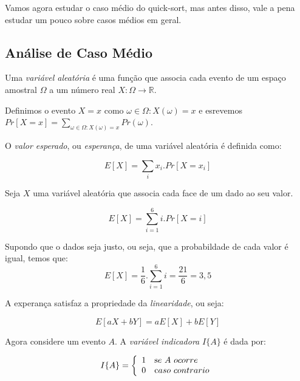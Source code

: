 Vamos agora estudar o caso médio do quick-sort, mas antes disso, vale a pena estudar um pouco sobre casos médios em geral.

\subsection{Análise de Caso Médio}

Uma {\em variável aleatória} é uma função que associa cada evento de um espaço amostral $\Omega$ a um número real $X: \Omega \to \mathbb{R}$.

Definimos o evento $X = x$ como ${\omega \in \Omega : X(\omega) = x}$ e esrevemos $Pr[X=x] = \sum_{\omega \in \Omega : X(\omega) = x}Pr(\omega)$.

O {\em valor esperado}, ou {\em esperança}, de uma variável aleatória é definida como:

\begin{displaymath}
  E[X] = \sum_i x_i.Pr[X = x_i]
\end{displaymath}

\begin{example}
  Seja $X$ uma variável aleatória que associa cada face de um dado ao seu valor.

  \begin{displaymath}
    E[X] = \sum_{i=1}^6 i.Pr[X = i]
  \end{displaymath}

  Supondo que o dados seja justo, ou seja, que a probabildade de cada valor é igual, temos que:
\begin{displaymath}
    E[X] = \frac{1}{6}.\sum_{i=1}^6 i = \frac{21}{6} = 3,5
  \end{displaymath}
  
\end{example}

A experança satisfaz a propriedade da {\em linearidade}, ou seja:

\begin{displaymath}
  E[aX + bY] = aE[X] + bE[Y]
\end{displaymath}

Agora considere um evento $A$.
A {\em variável indicadora} $I\{A\}$ é dada por:

\begin{displaymath}
  I\{A\} = \left\{ \begin{array}{cl}
                   1 & {\textrm se\ A\ ocorre}\\
                   0 & {\textrm caso\ contrario}
                   \end{array}\right.
\end{displaymath}

